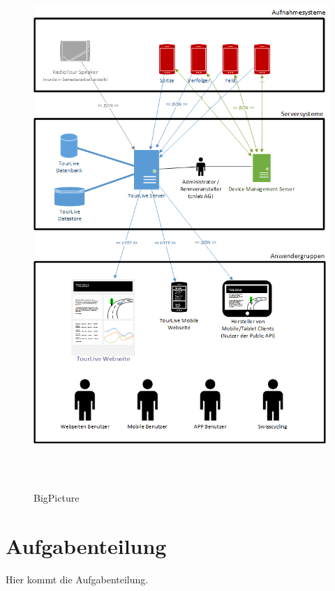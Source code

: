 \begin{figure}[H]
	\caption{BigPicture}
	\centering
	\includegraphics[height=200mm]{images/BigPicture.png}
\end{figure}

\section{Aufgabenteilung}

Hier kommt die Aufgabenteilung.